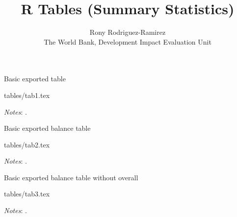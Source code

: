 \documentclass[a4paper]{article}
\title{R Tables (Summary Statistics)}
\author{Rony Rodriguez-Ramirez\\{\normalsize The World Bank, Development Impact Evaluation Unit}}
\makeatletter
\newcommand\primitiveinput[1]
{\@@input #1 }
\makeatother
\begin{document}
\maketitle
\listoftables
\newpage
\newpage 

\begin{table}[H]
	\centering
	\label{tab:tab1_summ_stats}
	\begin{adjustbox}{max width=\linewidth}
		\begin{threeparttable}
			\caption{Basic exported table}
      \primitiveinput{tables/tab1.tex}
			\begin{tablenotes}
				\setlength{}
				\footnotesize
				\item \textit{Notes}: \lipsum[1].
			\end{tablenotes}
		\end{threeparttable}
	\end{adjustbox}
\end{table}


\begin{table}[H]
	\centering
	\label{tab:tab2_balance}
	\begin{adjustbox}{max width=\linewidth}
		\begin{threeparttable}
			\caption{Basic exported balance table}
      \primitiveinput{tables/tab2.tex}
			\begin{tablenotes}
				\setlength\labelsep{0pt}
				\footnotesize
				\item \textit{Notes}: \lipsum[1].
			\end{tablenotes}
		\end{threeparttable}
	\end{adjustbox}
\end{table}


\begin{table}[H]
	\centering
	\label{tab:tab3_balance}
	\begin{adjustbox}{max width=\linewidth}
		\begin{threeparttable}
			\caption{Basic exported balance table without overall}
      \primitiveinput{tables/tab3.tex}
			\begin{tablenotes}
				\setlength\labelsep{0pt}
				\footnotesize
				\item \textit{Notes}: \lipsum[1].
			\end{tablenotes}
		\end{threeparttable}
	\end{adjustbox}
\end{table}
\end{document}
